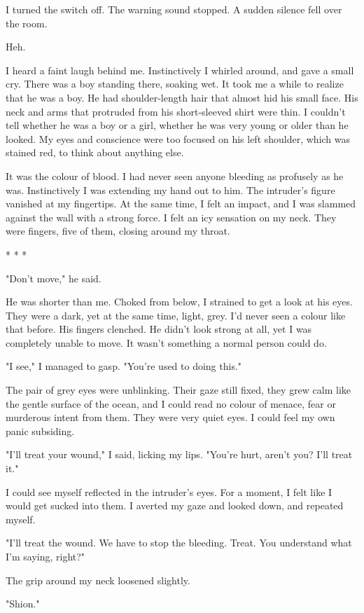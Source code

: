 I turned the switch off. The warning sound stopped. A sudden silence
fell over the room.

Heh.

I heard a faint laugh behind me. Instinctively I whirled around, and
gave a small cry. There was a boy standing there, soaking wet. It took
me a while to realize that he was a boy. He had shoulder-length hair
that almost hid his small face. His neck and arms that protruded from
his short-sleeved shirt were thin. I couldn't tell whether he was a boy
or a girl, whether he was very young or older than he looked. My eyes
and conscience were too focused on his left shoulder, which was stained
red, to think about anything else.

It was the colour of blood. I had never seen anyone bleeding as
profusely as he was. Instinctively I was extending my hand out to him.
The intruder's figure vanished at my fingertips. At the same time, I
felt an impact, and I was slammed against the wall with a strong force.
I felt an icy sensation on my neck. They were fingers, five of them,
closing around my throat.

* * *

"Don't move," he said.

He was shorter than me. Choked from below, I strained to get a look at
his eyes. They were a dark, yet at the same time, light, grey. I'd never
seen a colour like that before. His fingers clenched. He didn't look
strong at all, yet I was completely unable to move. It wasn't something
a normal person could do.

"I see," I managed to gasp. "You're used to doing this."

The pair of grey eyes were unblinking. Their gaze still fixed, they grew
calm like the gentle surface of the ocean, and I could read no colour of
menace, fear or murderous intent from them. They were very quiet eyes. I
could feel my own panic subsiding.

"I'll treat your wound," I said, licking my lips. "You're hurt, aren't
you? I'll treat it."

I could see myself reflected in the intruder's eyes. For a moment, I
felt like I would get sucked into them. I averted my gaze and looked
down, and repeated myself.

"I'll treat the wound. We have to stop the bleeding. Treat. You
understand what I'm saying, right?"

The grip around my neck loosened slightly.

"Shion."


